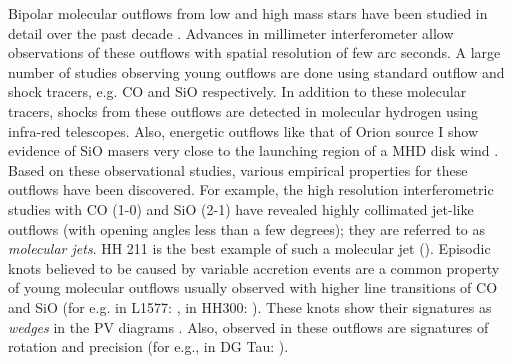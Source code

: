 \documentclass[useAMS,usenatbib]{mn2e}
\begin{document}
Bipolar molecular outflows from low and high mass stars
have been studied in detail over the past 
decade \citep[see reviews by][]{Bachiller:1996p4692, Beuther:2002p1149, Arce:2007p798,
Tafalla:2011p14051}. Advances in millimeter interferometer 
allow observations of these outflows with spatial resolution of
few arc seconds. A large number of studies observing young
outflows are done using standard outflow and shock tracers,
e.g. CO and SiO respectively. In addition to these molecular tracers,
shocks from these outflows are detected in molecular hydrogen using
infra-red telescopes. Also, energetic outflows like that of
Orion source I show evidence of SiO masers very close to the launching
region of a MHD disk wind \citep{Goddi:2009p8571, Vaidya:2013p12777}. 
Based on these observational studies, various
empirical properties for these outflows have been discovered. 
For example, the high resolution interferometric studies with
CO (1-0) and SiO (2-1) have revealed highly collimated jet-like
outflows (with opening angles less than a few degrees); they are
referred to as {\em{molecular jets}}. HH 211 is the best example of
such a molecular jet (\citealt{Gueth:1999p4683}).
Episodic knots believed to be caused by variable accretion events are a common property
of young molecular outflows usually observed with higher line
transitions of CO and SiO (for e.g. in L1577:
\citealt{Gueth:1998p14058}, in HH300: \citealt{Arce:2001p14064}). These knots show their signatures
as {\em{wedges}} in the PV diagrams \cite{Arce:2001p14065}. Also, 
observed in these outflows are signatures of rotation and
precision (for e.g., in DG Tau: \citealt{Bacciotti:2002p2084}).
%
\end{document}
